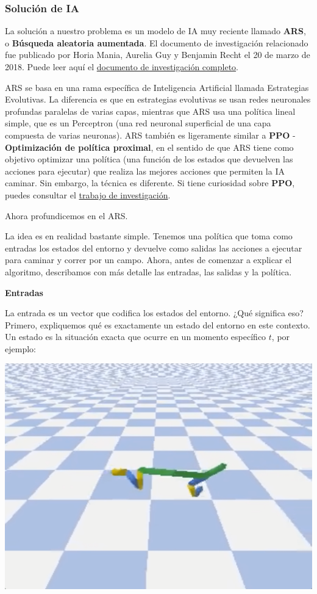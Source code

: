\documentclass[
]{book}
\begin{document}
\hypertarget{soluciuxf3n-de-ia-2}{%
\subsubsection{Solución de IA}\label{soluciuxf3n-de-ia-2}}

La solución a nuestro problema es un modelo de IA muy reciente llamado \textbf{ARS}, o \textbf{Búsqueda aleatoria aumentada}. El documento de investigación relacionado fue publicado por Horia Mania, Aurelia Guy y Benjamin Recht el 20 de marzo de 2018. Puede leer aquí el \href{https://arxiv.org/pdf/1803.07055.pdf}{documento de investigación completo}.

ARS se basa en una rama específica de Inteligencia Artificial llamada Estrategias Evolutivas. La diferencia es que en estrategias evolutivas se usan redes neuronales profundas paralelas de varias capas, mientras que ARS usa una política lineal simple, que es un Perceptron (una red neuronal superficial de una capa compuesta de varias neuronas). ARS también es ligeramente similar a \textbf{PPO} - \textbf{Optimización de política proximal}, en el sentido de que ARS tiene como objetivo optimizar una política (una función de los estados que devuelven las acciones para ejecutar) que realiza las mejores acciones que permiten la IA caminar. Sin embargo, la técnica es diferente. Si tiene curiosidad sobre \textbf{PPO}, puedes consultar el \href{https://arxiv.org/pdf/1707.06347.pdf}{trabajo de investigación}.

Ahora profundicemos en el ARS.

La idea es en realidad bastante simple. Tenemos una política que toma como entradas los estados del entorno y devuelve como salidas las acciones a ejecutar para caminar y correr por un campo. Ahora, antes de comenzar a explicar el algoritmo, describamos con más detalle las entradas, las salidas y la política.

\textbf{Entradas}

La entrada es un vector que codifica los estados del entorno. ¿Qué significa eso? Primero, expliquemos qué es exactamente un estado del entorno en este contexto. Un estado es la situación exacta que ocurre en un momento específico \(t\), por ejemplo:

\includegraphics{Images/Cheetah_in_the_air.png}
\end{document}
